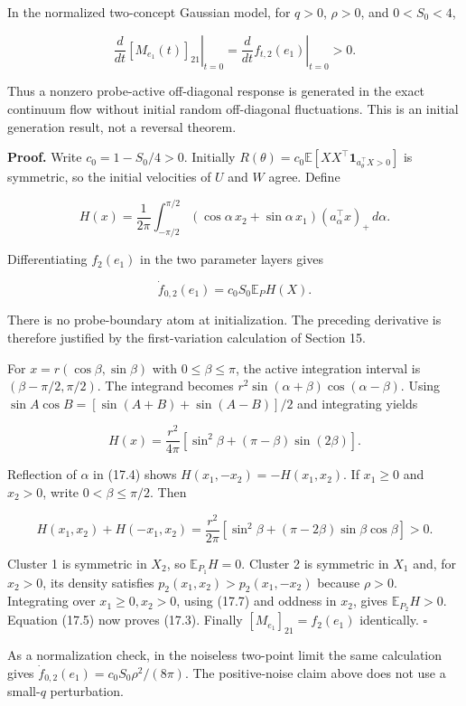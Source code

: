 \documentclass[
  10pt,
]{article}
\begin{document}
In the normalized two-concept Gaussian model, for \(q>0\), \(\rho>0\),
and \(0<S_0<4\),

\[
 \boxed{\left.\frac d{dt}[M_{e_1}(t)]_{21}\right|_{t=0}
       =\left.\frac d{dt}f_{t,2}(e_1)\right|_{t=0}>0.}
 \tag{17.3}
\]

Thus a nonzero probe-active off-diagonal response is generated in the
exact continuum flow without initial random off-diagonal fluctuations.
This is an initial generation result, not a reversal theorem.

\textbf{Proof.} Write \(c_0=1-S_0/4>0\). Initially
\(R(\theta)=c_0\mathbb E[XX^\top\mathbf1_{a_\theta^\top X>0}]\) is
symmetric, so the initial velocities of \(U\) and \(W\) agree. Define

\[
 H(x)=\frac1{2\pi}\int_{-\pi/2}^{\pi/2}
 (\cos\alpha\,x_2+\sin\alpha\,x_1)
 (a_\alpha^\top x)_+\,d\alpha.
 \tag{17.4}
\]

Differentiating \(f_2(e_1)\) in the two parameter layers gives

\[
 \dot f_{0,2}(e_1)=c_0S_0\mathbb E_P H(X).
 \tag{17.5}
\]

There is no probe-boundary atom at initialization. The preceding
derivative is therefore justified by the first-variation calculation of
Section 15.

For \(x=r(\cos\beta,\sin\beta)\) with \(0\le\beta\le\pi\), the active
integration interval is \((\beta-\pi/2,\pi/2)\). The integrand becomes
\(r^2\sin(\alpha+\beta)\cos(\alpha-\beta)\). Using
\(\sin A\cos B=[\sin(A+B)+\sin(A-B)]/2\) and integrating yields

\[
 H(x)=\frac{r^2}{4\pi}
       [\sin^2\beta+(\pi-\beta)\sin(2\beta)].
 \tag{17.6}
\]

Reflection of \(\alpha\) in (17.4) shows \(H(x_1,-x_2)=-H(x_1,x_2)\). If
\(x_1\ge0\) and \(x_2>0\), write \(0<\beta\le\pi/2\). Then

\[
 H(x_1,x_2)+H(-x_1,x_2)
 =\frac{r^2}{2\pi}
 [\sin^2\beta+(\pi-2\beta)\sin\beta\cos\beta]>0.
 \tag{17.7}
\]

Cluster 1 is symmetric in \(X_2\), so \(\mathbb E_{P_1}H=0\). Cluster 2
is symmetric in \(X_1\) and, for \(x_2>0\), its density satisfies
\(p_2(x_1,x_2)>p_2(x_1,-x_2)\) because \(\rho>0\). Integrating over
\(x_1\ge0,x_2>0\), using (17.7) and oddness in \(x_2\), gives
\(\mathbb E_{P_2}H>0\). Equation (17.5) now proves (17.3). Finally
\([M_{e_1}]_{21}=f_2(e_1)\) identically. \(\square\)

As a normalization check, in the noiseless two-point limit the same
calculation gives \(\dot f_{0,2}(e_1)=c_0S_0\rho^2/(8\pi)\). The
positive-noise claim above does not use a small-\(q\) perturbation.
\end{document}
